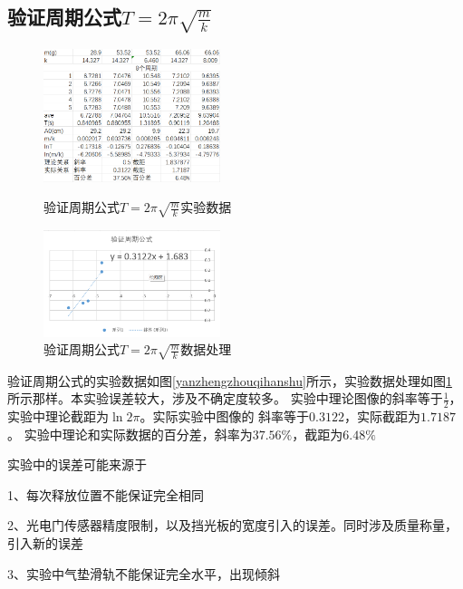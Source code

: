 \documentclass{ctexart}
\begin{document}
  \subsection{验证周期公式$T=2\pi \sqrt{\frac{m}{k}}$}
  \begin{figure}[b]
    \centering
    \begin{minipage}[b]{0.48\textwidth}
      \centering
      \includegraphics[width=0.46\textwidth]{yanzhengzhouqihanshu.png}
      \caption{验证周期公式$T=2\pi \sqrt{\frac{m}{k}}$实验数据}\label{yanzhengzhouqihanshu}
    \end{minipage}
    \begin{minipage}[b]{0.48\textwidth}
      \centering
      \includegraphics[width=0.46\textwidth]{yanzhengzhouqihanshuzuotu.png}
      \caption{验证周期公式$T=2\pi \sqrt{\frac{m}{k}}$数据处理}\label{yanzhengzhouqigongshizuotu}
    \end{minipage}
  \end{figure}
  验证周期公式的实验数据如图\ref{yanzhengzhouqihanshu}所示，实验数据处理如图\ref{yanzhengzhouqigongshizuotu}
  所示那样。本实验误差较大，涉及不确定度较多。
  实验中理论图像的斜率等于$\frac{1}{2}$，实验中理论截距为$\ln{2\pi}$。实际实验中图像的
  斜率等于$0.3122$，实际截距为$1.7187$。
  实验中理论和实际数据的百分差，斜率为$37.56\%$，截距为$6.48\%$

  实验中的误差可能来源于 
  
  1、每次释放位置不能保证完全相同

  2、光电门传感器精度限制，以及挡光板的宽度引入的误差。同时涉及质量称量，引入新的误差

  3、实验中气垫滑轨不能保证完全水平，出现倾斜
\end{document}
